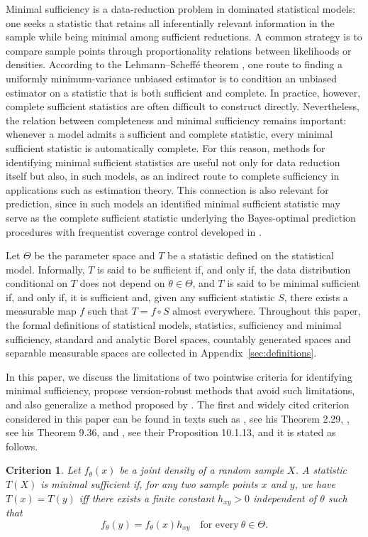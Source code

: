 \documentclass[12pt]{article}
\newtheorem{criterion}{Criterion}[section]
\begin{document}
Minimal sufficiency is a data-reduction problem in dominated statistical models: one seeks a statistic that retains all inferentially relevant information in the sample while being minimal among sufficient reductions. A common strategy is to compare sample points through proportionality relations between likelihoods or densities. According to the Lehmann--Scheff\'e theorem \citep[Theorem 7.17]{LieseMiescke2008}, one route to finding a uniformly minimum-variance unbiased estimator is to condition an unbiased estimator on a statistic that is both sufficient and complete. In practice, however, complete sufficient statistics are often difficult to construct directly. Nevertheless, the relation between completeness and minimal sufficiency remains important: whenever a model admits a sufficient and complete statistic, every minimal sufficient statistic is automatically complete. For this reason, methods for identifying minimal sufficient statistics are useful not only for data reduction itself but also, in such models, as an indirect route to complete sufficiency in applications such as estimation theory. This connection is also relevant for prediction, since in such models an identified minimal sufficient statistic may serve as the complete sufficient statistic underlying the Bayes-optimal prediction procedures with frequentist coverage control developed in \cite{Hoff2023}.

Let $\Theta$ be the parameter space and $T$ be a statistic defined on the statistical model. Informally, $T$ is said to be sufficient if, and only if, the data distribution conditional on $T$ does not depend on $\theta\in \Theta$, and $T$ is said to be minimal sufficient if, and only if, it is sufficient and, given any sufficient statistic $S$, there exists a measurable map $f$ such that $T = f \circ S$ almost everywhere. Throughout this paper, the formal definitions of statistical models, statistics, sufficiency and minimal sufficiency, standard and analytic Borel spaces, countably generated spaces and separable measurable spaces are collected in Appendix~\ref{sec:definitions}.

In this paper, we discuss the limitations of two pointwise criteria for identifying minimal sufficiency, propose version-robust methods that avoid such limitations, and also generalize a method proposed by \cite{Sato1996}. The first and widely cited criterion considered in this paper can be found in texts such as \cite{Schervish1995}, see his Theorem 2.29, \cite{Wasserman2004}, see his Theorem 9.36, and \cite{Mavrakakis2021}, see their Proposition 10.1.13, and it is stated as follows.
\begin{criterion}
\label{crit:2.1}
Let $f_\theta (x)$ be a joint density of a random sample $X$. A statistic $T(X)$ is minimal sufficient if, for any two sample points $x$ and $y$, we have $T(x)=T(y)$ iff there exists a finite constant $h_{xy}>0$ independent of $\theta$ such that \[f_\theta (y)=f_\theta (x)h_{xy} \quad \mbox{for every} \ \theta\in \Theta.\]
\end{criterion}
\end{document}

